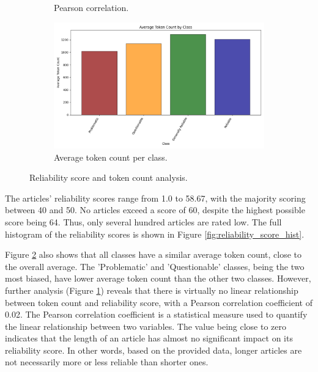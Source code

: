 \begin{figure}[htbp]
\begin{subfigure}{0.49\linewidth}
        \caption{Pearson correlation.}
        \label{fig:pearson}
    \end{subfigure}
    \begin{subfigure}{0.56\linewidth}
        \centering
        \includegraphics[width=1\linewidth]{figures/token_count_vx_per_class_hist.png}
        \caption{Average token count per class.}
        \label{fig:avg_token_per_class}
    \end{subfigure}
    \caption{Reliability score and token count analysis.}
    \label{fig:reliability_token_analysis}
\end{figure}

The articles' reliability scores range from 1.0 to 58.67, with the majority scoring between 40 and 50. No articles exceed a score of 60, despite the highest possible score being 64. Thus, only several hundred articles are rated low. The full histogram of the reliability scores is shown in Figure \ref{fig:reliability_score_hist}.

Figure \ref{fig:avg_token_per_class} also shows that all classes have a similar average token count, close to the overall average. The 'Problematic' and 'Questionable' classes, being the two most biased, have lower average token count than the other two classes. However, further analysis (Figure \ref{fig:pearson}) reveals that there is virtually no linear relationship between token count and reliability score, with a Pearson correlation coefficient  \cite{pearson-1896} of 0.02. The Pearson correlation coefficient \cite{pearson-1896} is a statistical measure used to quantify the linear relationship between two variables. The value being close to zero indicates that the length of an article has almost no significant impact on its reliability score. In other words, based on the provided data, longer articles are not necessarily more or less reliable than shorter ones.


